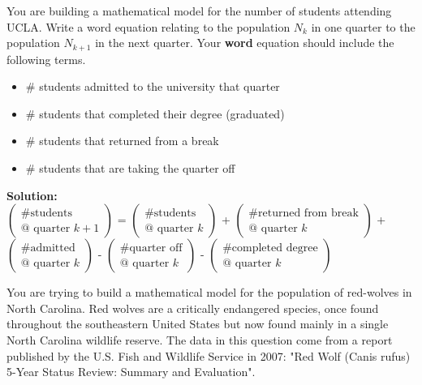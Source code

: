 \documentclass[addpoints, 11pt]{exam}
\begin{document}
\begin{questions}
You are building a mathematical model for the number of students attending UCLA. Write a word equation relating to the population $N_k$ in one quarter to the population $N_{k+1}$ in the next quarter. Your {\bf word} equation should include the following terms. 
\begin{itemize}
	\item $\#$ students admitted to the university that quarter
	\item $\#$ students that completed their degree (graduated)
	\item $\#$ students that returned from a break
	\item $\#$ students that are taking the quarter off
\end{itemize}
\textbf{Solution:} \\
$\begin{pmatrix}
	\text{\# students}\\
	\text{@ quarter }k+1
\end{pmatrix}$ =
$\begin{pmatrix}
	\text{\# students}\\
	\text{@ quarter }k
\end{pmatrix}$ +
$\begin{pmatrix}
	\text{\# returned from break}\\
	\text{@ quarter }k
\end{pmatrix}$ +
$\begin{pmatrix}
	\text{\# admitted}\\
	\text{@ quarter }k
\end{pmatrix}$ -
$\begin{pmatrix}
	\text{\# quarter off}\\
	\text{@ quarter }k
\end{pmatrix}$ - 
$\begin{pmatrix}
	\text{\# completed degree}\\
	\text{@ quarter }k
\end{pmatrix}$

\question You are trying to build a mathematical model for the population of red-wolves in North Carolina. Red wolves are a critically endangered species, once found throughout the southeastern United States but now found mainly in a single North Carolina wildlife reserve. The data in this question come from a report published by the U.S. Fish and Wildlife Service in 2007: "Red Wolf (Canis rufus) 5-Year Status Review: Summary and Evaluation".
\begin{parts}

\end{parts}
\end{questions}
\end{document}
